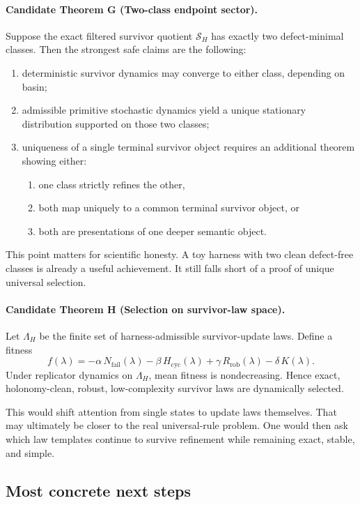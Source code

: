 \documentclass[11pt]{article}
\theoremstyle{remark}
\theoremstyle{plain}
\begin{document}
\paragraph{Candidate Theorem G (Two-class endpoint sector).}
Suppose the exact filtered survivor quotient \(\mathcal S_H\) has exactly two defect-minimal classes. Then the strongest safe claims are the following:
\begin{enumerate}[leftmargin=2em]
\item deterministic survivor dynamics may converge to either class, depending on basin;
\item admissible primitive stochastic dynamics yield a unique stationary distribution supported on those two classes;
\item uniqueness of a single terminal survivor object requires an additional theorem showing either:
\begin{enumerate}[leftmargin=2em]
\item one class strictly refines the other,
\item both map uniquely to a common terminal survivor object, or
\item both are presentations of one deeper semantic object.
\end{enumerate}
\end{enumerate}

This point matters for scientific honesty. A toy harness with two clean defect-free classes is already a useful achievement. It still falls short of a proof of unique universal selection.

\paragraph{Candidate Theorem H (Selection on survivor-law space).}
Let \(\Lambda_H\) be the finite set of harness-admissible survivor-update laws. Define a fitness
\[
f(\lambda)=
-\alpha\,N_{\mathrm{fail}}(\lambda)
-\beta\,H_{\mathrm{cyc}}(\lambda)
+\gamma\,R_{\mathrm{rob}}(\lambda)
-\delta\,K(\lambda).
\]
Under replicator dynamics on \(\Lambda_H\), mean fitness is nondecreasing. Hence exact, holonomy-clean, robust, low-complexity survivor laws are dynamically selected.

This would shift attention from single states to update laws themselves. That may ultimately be closer to the real universal-rule problem. One would then ask which law templates continue to survive refinement while remaining exact, stable, and simple.

\subsection{Most concrete next steps}
\end{document}
